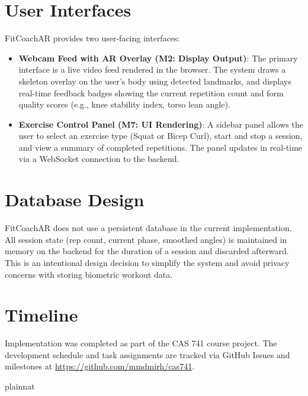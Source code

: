 \documentclass[12pt, titlepage]{article}
\begin{document}

\section{User Interfaces}

FitCoachAR provides two user-facing interfaces:

\begin{itemize}
  \item \textbf{Webcam Feed with AR Overlay (M2: Display Output)}: The primary
  interface is a live video feed rendered in the browser. The system draws a
  skeleton overlay on the user's body using detected landmarks, and displays
  real-time feedback badges showing the current repetition count and form
  quality scores (e.g., knee stability index, torso lean angle).

  \item \textbf{Exercise Control Panel (M7: UI Rendering)}: A sidebar panel
  allows the user to select an exercise type (Squat or Bicep Curl), start and
  stop a session, and view a summary of completed repetitions. The panel updates
  in real-time via a WebSocket connection to the backend.
\end{itemize}

\section{Database Design}

FitCoachAR does not use a persistent database in the current implementation.
All session state (rep count, current phase, smoothed angles) is maintained
in memory on the backend for the duration of a session and discarded afterward.
This is an intentional design decision to simplify the system and avoid
privacy concerns with storing biometric workout data.

\section{Timeline}

Implementation was completed as part of the CAS 741 course project.
The development schedule and task assignments are tracked via GitHub Issues
and milestones at \url{https://github.com/mmdmirh/cas741}.

 {plainnat}


\newpage{}
\end{document}
